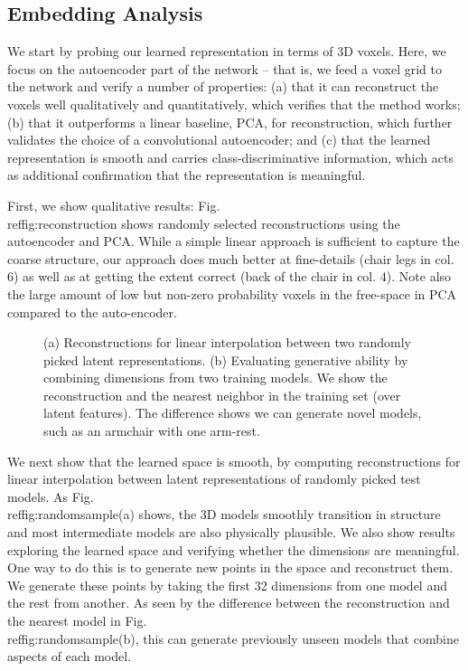 \documentclass[runningheads]{llncs}
\begin{document}
\subsection{Embedding Analysis}\label{sec:exp_reconstruction}We start by probing our learned representation in terms of 3D voxels.
Here, we focus on the autoencoder part of the network -- that is, we feed a voxel grid to the network
and verify a number of properties: (a) that it can reconstruct the voxels well qualitatively
and quantitatively, which verifies that the method works; (b) that it outperforms
a linear baseline, PCA, for reconstruction, which further validates the choice of a convolutional
autoencoder; and (c) that the learned representation
is smooth and carries class-discriminative
information, which acts as additional 
confirmation that the representation is meaningful.

First, we show qualitative results: Fig.\\ref{fig:reconstruction} shows randomly selected reconstructions using the autoencoder and PCA. While a simple
linear approach is sufficient to capture the coarse structure, our approach
does much better at fine-details (chair legs in col. 6) as well as at getting the extent
correct (back of the chair in col. 4). Note also the large amount of low but
non-zero probability voxels in the free-space in PCA compared to the
auto-encoder.

\begin{figure}[t]
\centering
{} \hfill
{}
\caption{(a) Reconstructions for linear interpolation between
two randomly picked latent representations. (b) Evaluating generative ability by combining dimensions from two 
training models. We show the reconstruction and the nearest neighbor in the
training set (over latent features). The difference shows we can generate novel
models, such as an armchair with one arm-rest.}
\label{fig:randomsample}
\end{figure}We next show that the learned space is smooth, by computing reconstructions for
linear interpolation between latent representations of randomly picked test models. 
As Fig.\\ref{fig:randomsample}(a) shows,
the 3D models smoothly transition in structure and most intermediate models are
also physically plausible.
We also show results exploring the learned space and verifying whether 
the dimensions are meaningful. One way to do this is to generate 
new points 
in the space and reconstruct them. We generate
these points by taking the first 32 dimensions from one model and the rest from
another. As seen by the difference between the reconstruction
and the nearest model in Fig.\\ref{fig:randomsample}(b), this can generate previously
unseen models that combine aspects of each model.
\end{document}
